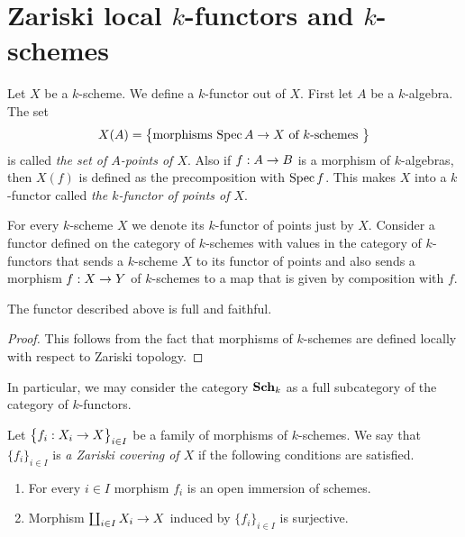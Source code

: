 \section{Zariski local $k$-functors and $k$-schemes}

\begin{definition}
Let $X$ be a $k$-scheme. We define a $k$-functor out of $X$. First let $A$ be a $k$-algebra. The set
$$X(A) = \big\{\mbox{morphisms }\mathrm{Spec}\, A\rightarrow X\mbox{ of }k\mbox{-schemes }\big\}$$
is called \textit{the set of $A$-points of $X$}. Also if $f:A\rightarrow B$ is a morphism of $k$-algebras, then $X(f)$ is defined as the precomposition with $\mathrm{Spec}\, f$. This makes $X$ into a $k$-functor called \textit{the $k$-functor of points of $X$}.
\end{definition}
\noindent
For every $k$-scheme $X$ we denote its $k$-functor of points just by $X$. Consider a functor defined on the category of $k$-schemes with values in the category of $k$-functors that sends a $k$-scheme $X$ to its functor of points and also sends a morphism $f:X\rightarrow Y$ of $k$-schemes to a map that is given by composition with $f$.

\begin{fact}\label{fact:kschemesandkfunctors}
The functor described above is full and faithful.
\end{fact}
\begin{proof}
This follows from the fact that morphisms of $k$-schemes are defined locally with respect to Zariski topology.
\end{proof}
\noindent
In particular, we may consider the category $\mathbf{Sch}_k$ as a full subcategory of the category of $k$-functors.

\begin{definition}
Let $\big\{f_i:X_i\rightarrow X\big\}_{i\in I}$ be a family of morphisms of $k$-schemes. We say that $\{f_i\}_{i\in I}$ is \textit{a Zariski covering of $X$} if the following conditions are satisfied.
\begin{enumerate}[label=\textbf{(\arabic*)}, leftmargin=1.5em]
\item For every $i\in I$ morphism $f_i$ is an open immersion of schemes.
\item Morphism $\coprod_{i\in I}X_i\rightarrow X$ induced by $\big\{f_i\big\}_{i\in I}$ is surjective.
\end{enumerate}
\end{definition}

